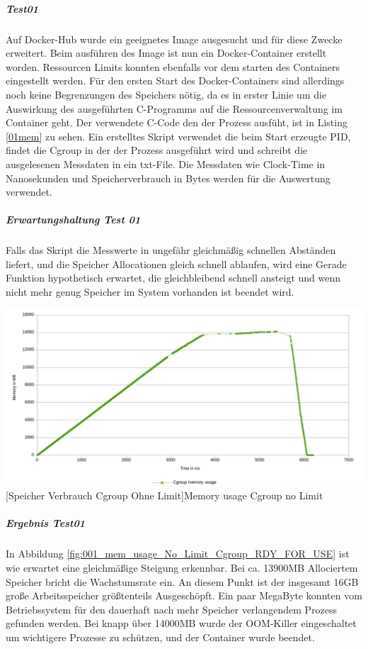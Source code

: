 \subparagraph{Test01}
Auf Docker-Hub wurde ein geeignetes Image ausgesucht und für diese Zwecke erweitert. Beim ausführen des Image ist nun ein Docker-Container erstellt worden. Ressourcen Limits konnten ebenfalls vor dem starten des Containers eingestellt werden. Für den ersten Start des Docker-Containers sind allerdings noch keine Begrenzungen des Speichers nötig, da es in erster Linie um die Auswirkung des ausgeführten C-Programms auf die Ressourcenverwaltung im Container geht. Der verwendete C-Code den der Prozess ausfüht, ist in Listing \ref{01mem} zu sehen. Ein erstelltes Skript verwendet die beim Start erzeugte PID, findet die Cgroup in der der Prozess ausgeführt wird und schreibt die ausgelesenen Messdaten in ein txt-File. Die Messdaten wie Clock-Time in Nanosekunden und Speicherverbrauch in Bytes werden für die Auswertung verwendet.

\vspace{1em}


\subparagraph{Erwartungshaltung Test 01}
Falls das Skript die Messwerte in ungefähr gleichmäßig schnellen Abständen liefert, und die Speicher Allocationen gleich schnell ablaufen, wird eine Gerade Funktion hypothetisch erwartet, die gleichbleibend schnell ansteigt und wenn nicht mehr genug Speicher im System vorhanden ist beendet wird.

\vspace{1em}
\begin{minipage}{\linewidth}
	\centering
	\includegraphics[width=1\linewidth]{pics/001_mem_usage_No_Limit_Cgroup_RDY_FOR_USE.png}
	[Speicher Verbrauch Cgroup Ohne Limit]{Memory usage Cgroup no Limit}
	\label{fig:001_mem_usage_No_Limit_Cgroup_RDY_FOR_USE}
\end{minipage}

\subparagraph{Ergebnis Test01}
In Abbildung \ref{fig:001_mem_usage_No_Limit_Cgroup_RDY_FOR_USE} ist wie erwartet eine gleichmäßige Steigung erkennbar. Bei ca. 13900MB Allociertem Speicher bricht die Wachstumsrate ein. An diesem Punkt ist der insgesamt 16GB große Arbeitsspeicher größtenteils Ausgeschöpft. Ein paar MegaByte konnten vom Betriebssystem für den dauerhaft nach mehr Speicher verlangendem Prozess gefunden werden. Bei knapp über 14000MB wurde der OOM-Killer eingeschaltet um wichtigere Prozesse zu schützen, und der Container wurde beendet.

